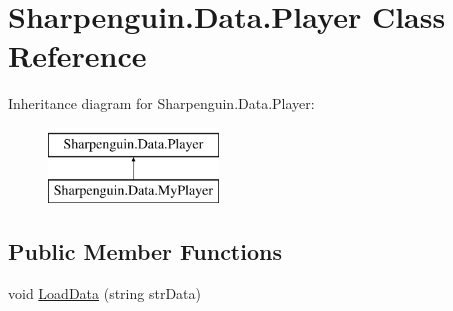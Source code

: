 \hypertarget{classSharpenguin_1_1Data_1_1Player}{\section{Sharpenguin.\-Data.\-Player Class Reference}
\label{classSharpenguin_1_1Data_1_1Player}
}
Inheritance diagram for Sharpenguin.\-Data.\-Player\-:\begin{figure}[H]
\begin{center}
\leavevmode
\includegraphics[height=2.000000cm]{classSharpenguin_1_1Data_1_1Player}
\end{center}
\end{figure}
\subsection*{Public Member Functions}
\begin{DoxyCompactItemize}
\item 
void \hyperlink{classSharpenguin_1_1Data_1_1Player_a22a732a7064e1ce773d624602527c880}{Load\-Data} (string str\-Data)
\end{DoxyCompactItemize}
